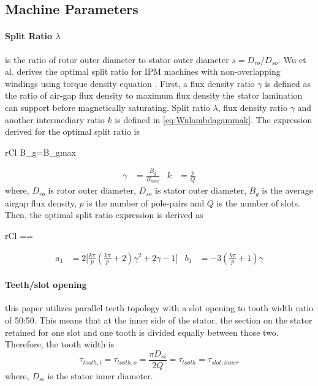 \documentclass [a4 paper, 11pt, titlepage] {article}
\begin{document}
	\subsection{Machine Parameters}
		
	\paragraph{Split Ratio $\lambda$} is the ratio of rotor outer diameter to stator outer diameter $s=D_{ro}/D_{so}$. Wu et al. derives the optimal split ratio for IPM machines with non-overlapping windings using torque density equation \cite{wu_optimal_2010}. First, a flux density ratio $\gamma$ is defined as the ratio of air-gap flux density to maximum flux density the stator lamination can support before magnetically saturating. Split ratio $\lambda$, flux density ratio $\gamma$ and another intermediary ratio $k$ is defined in \ref{eq:Wulambdagammak}. The expression derived for the optimal split ratio is
	
	\begin{IEEEeqnarray*}{rCl}
		B_g=B_{gmax}
	\end{IEEEeqnarray*}
	\begin{align}
		\gamma&=\frac{B_g}{B_{max}} & k&=\frac{p}{Q}
		\label{eq:Wulambdagammak}
	\end{align}
	where, $D_{ro}$ is rotor outer diameter, $D_{so}$ is stator outer diameter, $B_g$ is the average airgap flux density, $p$ is the number of pole-pairs and $Q$ is the number of slots. Then, the optimal split ratio expression is derived as
	\begin{IEEEeqnarray*}{rCl}
		\lambda==
	\end{IEEEeqnarray*}
	\begin{align*}
		a_1&=2\big[\frac{k\pi}{p}(\frac{k\pi}{p}+2)\gamma^2+2\gamma-1\big] & b_1&=-3(\frac{k\pi}{p}+1)\gamma
	\end{align*}
	
	\paragraph{Teeth/slot opening} this paper utilizes parallel teeth topology with a slot opening to tooth width ratio of 50:50. This means that at the inner side of the stator, the section on the stator retained for one slot and one tooth is divided equally between those two. Therefore, the tooth width is
	\begin{equation}
		\tau_{tooth,i}=\tau_{tooth,o}=\frac{\pi D_{si}}{2Q}=\tau_{tooth}=\tau_{slot,inner}
	\end{equation}
	where, $D_{si}$ is the stator inner diameter.
	
\end{document}
